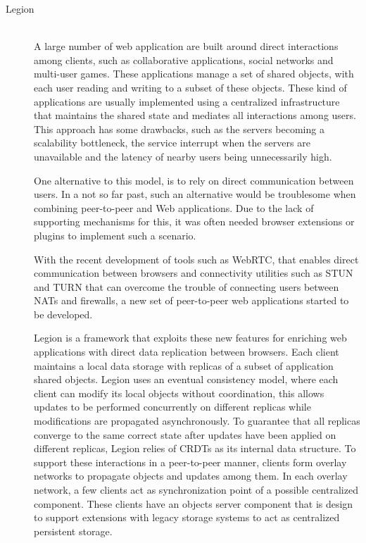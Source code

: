 \begin{description}

\item[Legion] \hfill \\
A large number of web application are built around direct interactions among clients, such as collaborative applications, social networks and multi-user games. These applications manage a set of shared objects, with each user reading and writing to a subset of these objects. These kind of applications are usually implemented using a centralized infrastructure that maintains the shared state and mediates all interactions among users. This approach has some drawbacks, such as the servers becoming a scalability bottleneck, the service interrupt when the servers are unavailable and the latency of nearby users being unnecessarily high.\par
	One alternative to this model, is to rely on direct communication between users. In a not so far past, such an alternative would be troublesome when combining peer-to-peer and Web applications. Due to the lack of supporting mechanisms for this, it was often needed browser extensions or plugins to implement such a scenario.\par
	With the recent development of tools such as WebRTC, that enables direct communication between browsers and connectivity utilities such as STUN and TURN that can overcome the trouble of connecting users between NATs and firewalls, a new set of peer-to-peer web applications started to be developed.\par
	Legion is a framework that exploits these new features for enriching web applications with direct data replication between browsers. Each client maintains a local data storage with replicas of a subset of application shared objects. Legion uses an eventual consistency model, where each client can modify its local objects without coordination, this allows updates to be performed concurrently on different replicas while modifications are propagated asynchronously. To guarantee that all replicas converge to the same correct state after updates have been applied on different replicas, Legion relies of CRDTs as its internal data structure. To support these interactions in a peer-to-peer manner, clients form overlay networks to propagate objects and updates among them. In each overlay network, a few clients act as synchronization point of a possible centralized component. These clients have an objects server component that is design to support extensions with legacy storage systems to act as centralized persistent storage.



\end{description}
